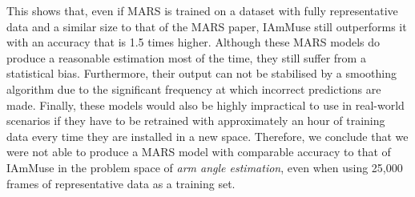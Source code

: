 This shows that, even if MARS is trained on a dataset with fully representative data and a similar size to that of the MARS paper, IAmMuse still outperforms it with an accuracy that is 1.5 times higher.
Although these MARS models do produce a reasonable estimation most of the time, they still suffer from a statistical bias.
Furthermore, their output can not be stabilised by a smoothing algorithm due to the significant frequency at which incorrect predictions are made.
Finally, these models would also be highly impractical to use in real-world scenarios if they have to be retrained with approximately an hour of training data every time they are installed in a new space.
Therefore, we conclude that we were not able to produce a MARS model with comparable accuracy to that of IAmMuse in the problem space of \textit{arm angle estimation}, even when using 25,000 frames of representative data as a training set.


